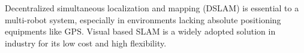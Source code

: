 Decentralized simultaneous localization and mapping (DSLAM) is essential to a multi-robot system, especially in environments lacking absolute positioning equipments like GPS. Visual based SLAM is a widely adopted solution in industry for its low cost and high flexibility. 